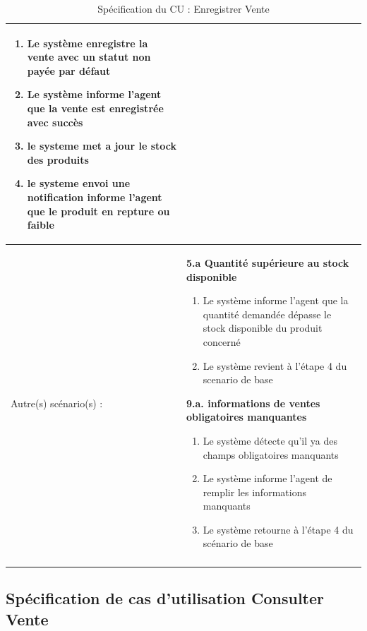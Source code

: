 \begin{longtable}{|>{\bfseries\raggedright\arraybackslash}p{3.5cm}|p{\dimexpr\textwidth-3.5cm-4\tabcolsep-2\arrayrulewidth}|}
\begin{enumerate}[leftmargin=1.5em, topsep=2pt, itemsep=1pt]
  \item Le système enregistre la vente avec un statut non payée par défaut
  \item Le système informe l'agent que la vente est enregistrée avec succès
  \item le systeme met a jour le stock des produits
  \item le systeme envoi une notification informe l'agent que le produit en repture ou faible
\end{enumerate} \\
\hline
Autre(s) scénario(s) : &
\textbf{5.a Quantité supérieure au stock disponible}
\begin{enumerate}[leftmargin=1.5em, topsep=2pt, itemsep=1pt]
  \item Le système informe l'agent que la quantité demandée dépasse le stock disponible du produit concerné
  \item Le système revient à l'étape 4 du scenario de base
\end{enumerate}
\textbf{9.a. informations de ventes obligatoires manquantes}
\begin{enumerate}[leftmargin=1.5em, topsep=2pt, itemsep=1pt]
  \item Le système détecte qu'il ya des champs obligatoires manquants
  \item Le système informe l'agent de remplir les informations manquants
  \item Le système retourne à l'étape 4 du scénario de base
\end{enumerate} \\
\hline
\caption{Spécification du CU : Enregistrer Vente}
\label{tab:cu-enregistrer-vente}
\end{longtable}

\newpage
{}
\subsection{Spécification de cas d'utilisation Consulter Vente}

